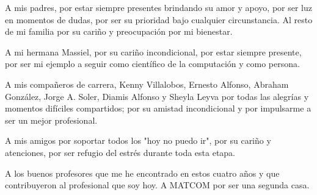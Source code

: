 \begin{acknowledgements}
A mis padres, por estar siempre presentes brindando su amor y apoyo, por ser luz 
en momentos de dudas, por ser su prioridad bajo cualquier circunstancia. Al resto de mi 
familia por su cariño y preocupaci\'on por mi bienestar. 

A mi hermana Massiel, por su cariño incondicional, por estar siempre presente, 
por ser mi ejemplo a seguir como cient\'ifico de la computaci\'on y como persona. 

A mis compañeros de carrera, Kenny Villalobos, Ernesto Alfonso, Abraham González, Jorge A. Soler, Diamis Alfonso 
y Sheyla Leyva por todas las alegr\'ias y momentos difíciles compartidos; por su amistad incondicional y por 
impulsarme a ser un mejor profesional.

A mis amigos por soportar todos los "hoy no puedo ir", por su cariño y atenciones, por ser refugio del 
estrés durante toda esta etapa.

A los buenos profesores que me he encontrado en estos cuatro años y que contribuyeron al profesional que soy hoy. 
A MATCOM por ser una segunda casa.
\end{acknowledgements}